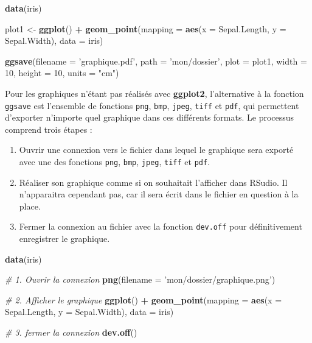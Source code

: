 \documentclass[
  11pt,
  french,
]{book}
\makeatletter
\newenvironment{Shaded}{\begin{snugshade}}{\end{snugshade}}
\newcommand{\CommentTok}[1]{\textcolor[rgb]{0.56,0.35,0.01}{\textit{#1}}}
\newcommand{\DataTypeTok}[1]{\textcolor[rgb]{0.13,0.29,0.53}{#1}}
\newcommand{\DecValTok}[1]{\textcolor[rgb]{0.00,0.00,0.81}{#1}}
\newcommand{\KeywordTok}[1]{\textcolor[rgb]{0.13,0.29,0.53}{\textbf{#1}}}
\newcommand{\NormalTok}[1]{#1}
\newcommand{\OperatorTok}[1]{\textcolor[rgb]{0.81,0.36,0.00}{\textbf{#1}}}
\newcommand{\StringTok}[1]{\textcolor[rgb]{0.31,0.60,0.02}{#1}}
\providecommand{\tightlist}{%
  \setlength{\itemsep}{0pt}\setlength{\parskip}{0pt}}
\newenvironment{kframe}{%
\medskip{}
\setlength{\fboxsep}{.8em}
 \def\at@end@of@kframe{}%
 \ifinner\ifhmode%
  \def\at@end@of@kframe{\end{minipage}}%
  \begin{minipage}{\columnwidth}%
 \fi\fi%
 \def\FrameCommand##1{\hskip\@totalleftmargin \hskip-\fboxsep
 \colorbox{shadecolor}{##1}\hskip-\fboxsep
     \hskip-\linewidth \hskip-\@totalleftmargin \hskip\columnwidth}%
 \MakeFramed {\advance\hsize-\width
   \@totalleftmargin\z@ \linewidth\hsize
   \@setminipage}}%
 {\par\unskip\endMakeFramed%
 \at@end@of@kframe}
\renewenvironment{Shaded}{\begin{kframe}}{\end{kframe}}
\makeatother
\begin{document}
\begin{Shaded}
\begin{Highlighting}[]
\KeywordTok{data}\NormalTok{(iris)}

\NormalTok{plot1 <-}\StringTok{ }\KeywordTok{ggplot}\NormalTok{() }\OperatorTok{+}
\StringTok{  }\KeywordTok{geom_point}\NormalTok{(}\DataTypeTok{mapping =} \KeywordTok{aes}\NormalTok{(}\DataTypeTok{x =}\NormalTok{ Sepal.Length, }\DataTypeTok{y =}\NormalTok{ Sepal.Width), }\DataTypeTok{data =}\NormalTok{ iris)}

\KeywordTok{ggsave}\NormalTok{(}\DataTypeTok{filename =} \StringTok{'graphique.pdf'}\NormalTok{,}
       \DataTypeTok{path =} \StringTok{'mon/dossier'}\NormalTok{,}
       \DataTypeTok{plot =}\NormalTok{ plot1,}
       \DataTypeTok{width =} \DecValTok{10}\NormalTok{, }\DataTypeTok{height =} \DecValTok{10}\NormalTok{, }\DataTypeTok{units =} \StringTok{"cm"}\NormalTok{)}
\end{Highlighting}
\end{Shaded}

Pour les graphiques n'étant pas réalisés avec \textbf{ggplot2}, l'alternative à la fonction \texttt{ggsave} est l'ensemble de fonctions \texttt{png}, \texttt{bmp}, \texttt{jpeg}, \texttt{tiff} et \texttt{pdf}, qui permettent d'exporter n'importe quel graphique dans ces différents formats. Le processus comprend trois étapes :

\begin{enumerate}
\def\labelenumi{\arabic{enumi}.}
\tightlist
\item
  Ouvrir une connexion vers le fichier dans lequel le graphique sera exporté avec une des fonctions \texttt{png}, \texttt{bmp}, \texttt{jpeg}, \texttt{tiff} et \texttt{pdf}.
\item
  Réaliser son graphique comme si on souhaitait l'afficher dans RSudio. Il n'apparaitra cependant pas, car il sera écrit dans le fichier en question à la place.
\item
  Fermer la connexion au fichier avec la fonction \texttt{dev.off} pour définitivement enregistrer le graphique.
\end{enumerate}

\begin{Shaded}
\begin{Highlighting}[]
\KeywordTok{data}\NormalTok{(iris)}

\CommentTok{# 1. Ouvrir la connexion}
\KeywordTok{png}\NormalTok{(}\DataTypeTok{filename =} \StringTok{'mon/dossier/graphique.png'}\NormalTok{)}

\CommentTok{# 2. Afficher le graphique}
\KeywordTok{ggplot}\NormalTok{() }\OperatorTok{+}
\StringTok{  }\KeywordTok{geom_point}\NormalTok{(}\DataTypeTok{mapping =} \KeywordTok{aes}\NormalTok{(}\DataTypeTok{x =}\NormalTok{ Sepal.Length, }\DataTypeTok{y =}\NormalTok{ Sepal.Width), }\DataTypeTok{data =}\NormalTok{ iris)}

\CommentTok{# 3. fermer la connexion}
\KeywordTok{dev.off}\NormalTok{()}
\end{Highlighting}
\end{Shaded}
\end{document}
